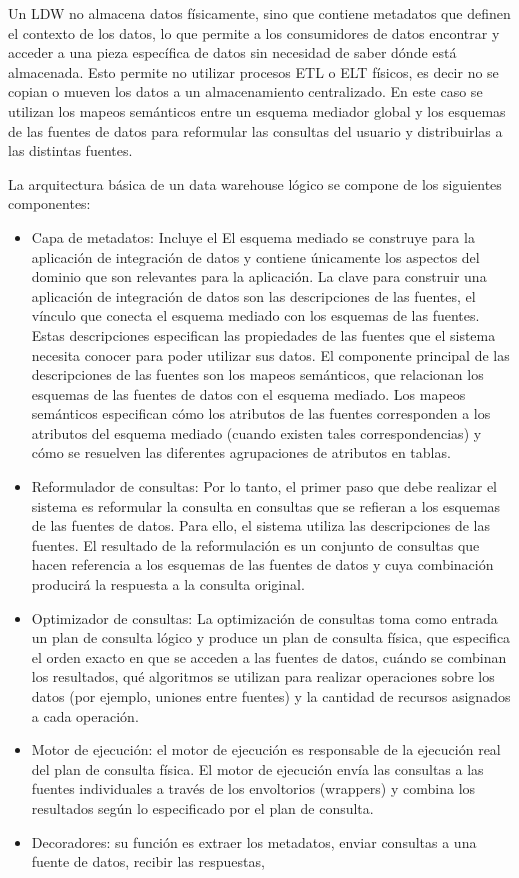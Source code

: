 Un LDW no almacena datos físicamente, sino que contiene metadatos que definen el contexto de los datos, lo que permite a los consumidores de datos encontrar y acceder a una pieza específica de datos sin necesidad de saber dónde está almacenada.
Esto permite no utilizar procesos ETL o ELT físicos, es decir no se copian o mueven los datos a un almacenamiento
centralizado. En este caso se utilizan los mapeos semánticos entre un esquema mediador global y los esquemas de las fuentes
de datos para reformular las consultas del usuario y distribuirlas a las distintas fuentes.

La arquitectura básica de un data warehouse lógico se compone de los siguientes componentes:

\begin{itemize}
    \item Capa de metadatos: Incluye el El esquema mediado se construye para la aplicación de integración de datos y contiene únicamente los aspectos del dominio que son relevantes para la aplicación. La clave para construir una aplicación de integración de datos son las descripciones de las fuentes, el vínculo que conecta el esquema mediado con los esquemas de las fuentes. Estas descripciones especifican las propiedades de las fuentes que el sistema necesita conocer para poder utilizar sus datos. El componente principal de las descripciones de las fuentes son los mapeos semánticos, que relacionan los esquemas de las fuentes de datos con el esquema mediado. Los mapeos semánticos especifican cómo los atributos de las fuentes corresponden a los atributos del esquema mediado (cuando existen tales correspondencias) y cómo se resuelven las diferentes agrupaciones de atributos en tablas.
    \item Reformulador de consultas: Por lo tanto, el primer paso que debe realizar el sistema es reformular la consulta en consultas que se refieran a los esquemas de las fuentes de datos. Para ello, el sistema utiliza las descripciones de las fuentes. El resultado de la reformulación es un conjunto de consultas que hacen referencia a los esquemas de las fuentes de datos y cuya combinación producirá la respuesta a la consulta original.
    \item Optimizador de consultas:  La optimización de consultas toma como entrada un plan de consulta lógico y produce un plan de consulta física, que especifica el orden exacto en que se acceden a las fuentes de datos, cuándo se combinan los resultados, qué algoritmos se utilizan para realizar operaciones sobre los datos (por ejemplo, uniones entre fuentes) y la cantidad de recursos asignados a cada operación.
    \item Motor de ejecución: el motor de ejecución es responsable de la ejecución real del plan de consulta física. El motor de ejecución envía las consultas a las fuentes individuales a través de los envoltorios (wrappers) y combina los resultados según lo especificado por el plan de consulta.
    \item Decoradores: su función es extraer los metadatos, enviar consultas a una fuente de datos, recibir las respuestas,
    
\end{itemize}

